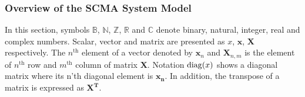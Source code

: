 

\subsubsection{Overview of the SCMA System Model}
\label{sec:ctx_scma_overview}

In this section, symbols $\mathbb{B}$, $\mathbb{N}$, $\mathbb{Z}$, $\mathbb{R}$
and $\mathbb{C}$ denote binary, natural, integer, real and complex numbers.
Scalar, vector and matrix are presented as $x$, $\bm{x}$, $\bm{X}$ respectively.
The $n^\text{th}$ element of a vector denoted by $\bm{x}_n$ and $\bm{X}_{n,m}$
is the element of $n^\text{th}$ row and $m^\text{th}$ column of matrix $\bm{X}$.
Notation $\operatorname{diag}(x)$ shows a diagonal matrix where its n'th diagonal element is
$\bm{x_n}$. In addition, the transpose of a matrix is expressed as $\bm{X^T}$.

